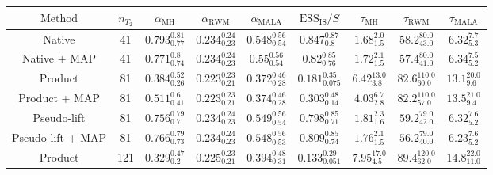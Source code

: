 \begin{tabular}{ccccccccc}
  \toprule
  \textbf{$\mathrm{Method}$} & \textbf{$n_{T_2}$} & \textbf{$\alpha_{\mathrm{MH}}$} & \textbf{$\alpha_{\mathrm{RWM}}$} & \textbf{$\alpha_{\mathrm{MALA}}$} & \textbf{$\mathrm{ESS}_{\mathrm{IS}}/S$} & \textbf{$\tau_{\mathrm{MH}}$} & \textbf{$\tau_{\mathrm{RWM}}$} & \textbf{$\tau_{\mathrm{MALA}}$} \\
  \midrule
  Native                     & 41                 & $0.793^{0.81}_{0.77}$           & $0.234^{0.24}_{0.23}$            & $0.548^{0.56}_{0.54}$             & $0.847^{0.87}_{0.8}$                    & $1.68^{2.0}_{1.5}$            & $58.2^{80.0}_{43.0}$           & $6.32^{7.7}_{5.3}$              \\
  Native + MAP               & 41                 & $0.771^{0.8}_{0.74}$            & $0.234^{0.24}_{0.23}$            & $0.55^{0.56}_{0.54}$              & $0.82^{0.85}_{0.76}$                    & $1.72^{2.1}_{1.5}$            & $57.4^{80.0}_{41.0}$           & $6.34^{7.5}_{5.2}$              \\
  Product                    & 81                 & $0.384^{0.52}_{0.26}$           & $0.223^{0.23}_{0.21}$            & $0.372^{0.46}_{0.28}$             & $0.181^{0.35}_{0.075}$                  & $6.42^{13.0}_{3.8}$           & $82.6^{110.0}_{60.0}$          & $13.1^{20.0}_{9.6}$             \\
  Product + MAP              & 81                 & $0.511^{0.6}_{0.41}$            & $0.223^{0.23}_{0.21}$            & $0.374^{0.46}_{0.28}$             & $0.303^{0.48}_{0.14}$                   & $4.03^{6.7}_{2.8}$            & $82.2^{110.0}_{57.0}$          & $13.5^{21.0}_{9.4}$             \\
  Pseudo-lift                & 81                 & $0.756^{0.79}_{0.7}$            & $0.234^{0.24}_{0.23}$            & $0.549^{0.56}_{0.54}$             & $0.798^{0.85}_{0.71}$                   & $1.81^{2.3}_{1.6}$            & $59.2^{79.0}_{42.0}$           & $6.32^{7.6}_{5.2}$              \\
  Pseudo-lift + MAP          & 81                 & $0.766^{0.79}_{0.73}$           & $0.234^{0.24}_{0.23}$            & $0.548^{0.56}_{0.53}$             & $0.809^{0.85}_{0.74}$                   & $1.76^{2.1}_{1.5}$            & $56.2^{79.0}_{40.0}$           & $6.23^{7.6}_{5.2}$              \\
  Product                    & 121                & $0.329^{0.47}_{0.2}$            & $0.225^{0.23}_{0.21}$            & $0.394^{0.48}_{0.31}$             & $0.133^{0.29}_{0.051}$                  & $7.95^{17.0}_{4.5}$           & $89.4^{120.0}_{62.0}$          & $14.8^{22.0}_{11.0}$            \\

\end{tabular}
